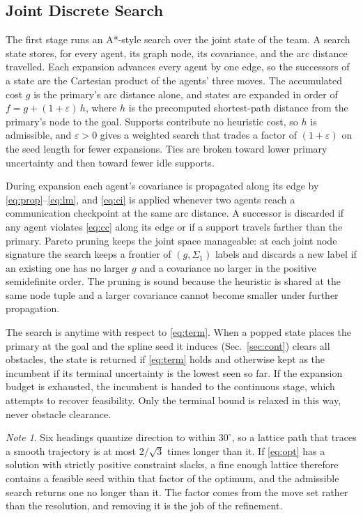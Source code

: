 \documentclass[letterpaper, 10 pt, conference]{ieeeconf}
\theoremstyle{remark}
\newtheorem*{note}{Note}
\begin{document}
\subsection{Joint Discrete Search}

The first stage runs an A*-style search \cite{hart1968astar} over the joint
state of the team. A search state stores, for every agent, its graph node,
its covariance, and the arc distance travelled. Each expansion advances
every agent by one edge, so the successors of a state are the Cartesian
product of the agents' three moves. The accumulated cost $g$ is the
primary's arc distance alone, and states are expanded in order of
$f = g + (1+\varepsilon)\,h$, where $h$ is the precomputed shortest-path
distance from the primary's node to the goal. Supports contribute no
heuristic cost, so $h$ is admissible, and $\varepsilon > 0$ gives a weighted
search that trades a factor of $(1+\varepsilon)$ on the seed length for
fewer expansions. Ties are broken toward lower primary
uncertainty and then toward fewer idle supports.

During expansion each agent's covariance is propagated along its edge by
\eqref{eq:prop}--\eqref{eq:lm}, and \eqref{eq:ci} is applied whenever two
agents reach a communication checkpoint at the same arc distance. A
successor is discarded if any agent violates \eqref{eq:cc} along its edge or
if a support travels farther than the primary. Pareto pruning keeps the
joint space manageable: at each joint node signature the search keeps a
frontier of $(g, \Sigma_1)$ labels and discards a new label if an existing
one has no larger $g$ and a covariance no larger in the positive
semidefinite order. The pruning is sound because the heuristic is shared at
the same node tuple and a larger covariance cannot become smaller under
further propagation.

The search is anytime with respect to \eqref{eq:term}. When a popped state
places the primary at the goal and the spline seed it induces
(Sec.~\ref{sec:cont}) clears all obstacles, the state is returned if
\eqref{eq:term} holds and otherwise kept as the incumbent if its terminal
uncertainty is the lowest seen so far. If the expansion budget is exhausted,
the incumbent is handed to the continuous stage, which attempts to recover
feasibility. Only the terminal bound is relaxed in this way, never obstacle
clearance.

\begin{note}
Six headings quantize direction to within $30^\circ$, so a lattice path that
traces a smooth trajectory is at most $2/\sqrt{3}$ times longer than it. If
\eqref{eq:opt} has a solution with strictly positive constraint slacks, a
fine enough lattice therefore contains a feasible seed within that factor of
the optimum, and the admissible search returns one no longer than it. The
factor comes from the move set rather than the resolution, and removing it
is the job of the refinement.
\end{note}
\end{document}
